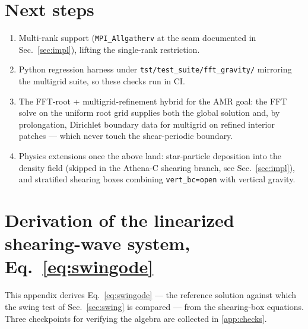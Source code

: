 \documentclass[11pt]{article}
\newcommand{\code}[1]{\texttt{#1}}
\begin{document}
\section{Next steps}
\begin{enumerate}
  \item Multi-rank support (\code{MPI\_Allgatherv} at the seam documented in
        Sec.~\ref{sec:impl}), lifting the single-rank restriction.
  \item Python regression harness under \code{tst/test\_suite/fft\_gravity/}
        mirroring the multigrid suite, so these checks run in CI.
  \item The FFT-root + multigrid-refinement hybrid for the AMR goal: the FFT solve
        on the uniform root grid supplies both the global solution and, by
        prolongation, Dirichlet boundary data for multigrid on refined interior
        patches --- which never touch the shear-periodic boundary.
  \item Physics extensions once the above land: star-particle deposition into the
        density field (skipped in the Athena-C shearing branch, see
        Sec.~\ref{sec:impl}), and stratified shearing boxes combining
        \code{vert\_bc=open} with vertical gravity.
\end{enumerate}

\appendix
\section{\texorpdfstring{Derivation of the linearized shearing-wave system,
         Eq.~\eqref{eq:swingode}}{Derivation of the linearized shearing-wave system}}
\label{app:swing}

This appendix derives Eq.~\eqref{eq:swingode} --- the reference solution against which
the swing test of Sec.~\ref{sec:swing} is compared --- from the shearing-box equations.
Three checkpoints for verifying the algebra are collected in \ref{app:checks}.
\end{document}

